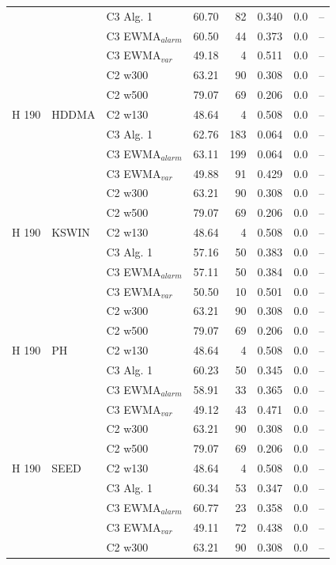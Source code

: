 \begin{longtable}{lllrrrrr}
 &  & C3 Alg. 1 & 60.70 & 82 & 0.340 & 0.0 & -- \\
 &  & C3 EWMA$_{alarm}$ & 60.50 & 44 & 0.373 & 0.0 & -- \\
 &  & C3 EWMA$_{var}$ & 49.18 & 4 & 0.511 & 0.0 & -- \\
 &  & C2 w300 & 63.21 & 90 & 0.308 & 0.0 & -- \\
 &  & C2 w500 & 79.07 & 69 & 0.206 & 0.0 & -- \\
\hline
H  190 & HDDMA & C2 w130 & 48.64 & 4 & 0.508 & 0.0 & -- \\
 &  & C3 Alg. 1 & 62.76 & 183 & 0.064 & 0.0 & -- \\
 &  & C3 EWMA$_{alarm}$ & 63.11 & 199 & 0.064 & 0.0 & -- \\
 &  & C3 EWMA$_{var}$ & 49.88 & 91 & 0.429 & 0.0 & -- \\
 &  & C2 w300 & 63.21 & 90 & 0.308 & 0.0 & -- \\
 &  & C2 w500 & 79.07 & 69 & 0.206 & 0.0 & -- \\
\hline
H  190 & KSWIN & C2 w130 & 48.64 & 4 & 0.508 & 0.0 & -- \\
 &  & C3 Alg. 1 & 57.16 & 50 & 0.383 & 0.0 & -- \\
 &  & C3 EWMA$_{alarm}$ & 57.11 & 50 & 0.384 & 0.0 & -- \\
 &  & C3 EWMA$_{var}$ & 50.50 & 10 & 0.501 & 0.0 & -- \\
 &  & C2 w300 & 63.21 & 90 & 0.308 & 0.0 & -- \\
 &  & C2 w500 & 79.07 & 69 & 0.206 & 0.0 & -- \\
\hline
H  190 & PH & C2 w130 & 48.64 & 4 & 0.508 & 0.0 & -- \\
 &  & C3 Alg. 1 & 60.23 & 50 & 0.345 & 0.0 & -- \\
 &  & C3 EWMA$_{alarm}$ & 58.91 & 33 & 0.365 & 0.0 & -- \\
 &  & C3 EWMA$_{var}$ & 49.12 & 43 & 0.471 & 0.0 & -- \\
 &  & C2 w300 & 63.21 & 90 & 0.308 & 0.0 & -- \\
 &  & C2 w500 & 79.07 & 69 & 0.206 & 0.0 & -- \\
\hline
H  190 & SEED & C2 w130 & 48.64 & 4 & 0.508 & 0.0 & -- \\
 &  & C3 Alg. 1 & 60.34 & 53 & 0.347 & 0.0 & -- \\
 &  & C3 EWMA$_{alarm}$ & 60.77 & 23 & 0.358 & 0.0 & -- \\
 &  & C3 EWMA$_{var}$ & 49.11 & 72 & 0.438 & 0.0 & -- \\
 &  & C2 w300 & 63.21 & 90 & 0.308 & 0.0 & -- \\

\end{longtable}
